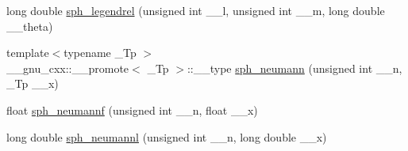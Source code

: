 \begin{DoxyCompactItemize}
long double \hyperlink{group__tr29124__math__spec__func_ga2f6618dea1847f09fd67f3c974c1910d}{sph\+\_\+legendrel} (unsigned int \+\_\+\+\_\+l, unsigned int \+\_\+\+\_\+m, long double \+\_\+\+\_\+theta)
\item 
{\footnotesize template$<$typename \+\_\+\+Tp $>$ }\\\+\_\+\+\_\+gnu\+\_\+cxx\+::\+\_\+\+\_\+promote$<$ \+\_\+\+Tp $>$\+::\+\_\+\+\_\+type \hyperlink{group__tr29124__math__spec__func_ga1cf4362a67ab5bae9e6b69c867e85371}{sph\+\_\+neumann} (unsigned int \+\_\+\+\_\+n, \+\_\+\+Tp \+\_\+\+\_\+x)
\item 
float \hyperlink{group__tr29124__math__spec__func_ga789143122fa99536329bc2d1b1aac2f0}{sph\+\_\+neumannf} (unsigned int \+\_\+\+\_\+n, float \+\_\+\+\_\+x)
\item 
long double \hyperlink{group__tr29124__math__spec__func_ga3cededa9b6e4601f190c3811e6aabfd6}{sph\+\_\+neumannl} (unsigned int \+\_\+\+\_\+n, long double \+\_\+\+\_\+x)
\end{DoxyCompactItemize}
